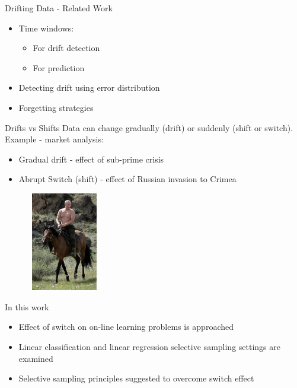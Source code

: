 \documentclass{beamer}
\begin{document}
\begin{frame}{Drifting Data - Related Work}


\begin{itemize}
\item Time windows:\newline
\begin{itemize}
\item For drift detection\newline
\item For prediction\newline
\end{itemize}
\item Detecting drift using error distribution\newline
\item Forgetting strategies
\end{itemize}
\end{frame}

\begin{frame}{Drifts vs Shifts}
Data can change gradually (drift) or suddenly (shift or switch). \newline\newline
Example - market analysis:\newline
\begin{itemize}
\item Gradual drift -  effect of sub-prime crisis
\item  Abrupt Switch (shift)  - effect of Russian invasion to Crimea 
\end{itemize}
\begin{center}
\includegraphics[height=1.7in,width=2.1in]{putin.jpg}
\end{center}
\end{frame}

\begin{frame}{In this work}
\begin{itemize}
\item Effect of switch on on-line learning problems is approached\newline
\item Linear classification and linear regression selective sampling settings are examined\newline
\item Selective sampling principles suggested to overcome switch effect\newline
\end{itemize}
\end{frame}
\end{document}
